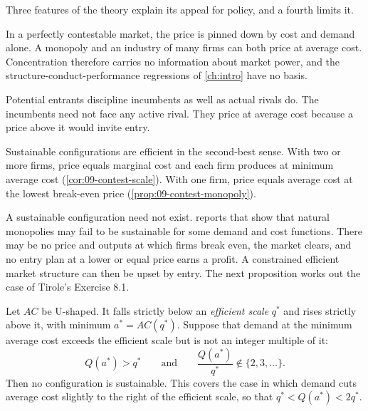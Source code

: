 Three features of the theory explain its appeal for policy, and a fourth limits it.

\begin{remark}\label{rem:09-structure}
In a perfectly contestable market, the price is pinned down by cost and demand alone. A monopoly and an
industry of many firms can both price at average cost. Concentration therefore carries no information about
market power, and the structure-conduct-performance regressions of \cref{ch:intro} have no basis.
\end{remark}

\begin{remark}\label{rem:09-potential}
Potential entrants discipline incumbents as well as actual rivals do. The incumbents need not face any active
rival. They price at average cost because a price above it would invite entry.
\end{remark}

\begin{remark}[Efficiency]\label{rem:09-efficiency}
Sustainable configurations are efficient in the second-best sense. With two or more firms, price equals
marginal cost and each firm produces at minimum average cost (\cref{cor:09-contest-scale}). With one firm,
price equals average cost at the lowest break-even price (\cref{prop:09-contest-monopoly}).
\end{remark}

\begin{remark}[Existence]\label{rem:09-existence}
A sustainable configuration need not exist. \citet[sec.~8.1.2]{Tirole1988} reports that
\citet{BaumolPanzarWillig1982} show that natural monopolies may fail to be sustainable for some demand and
cost functions. There may be no price and outputs at which firms break even, the market clears, and no entry
plan at a lower or equal price earns a profit. A constrained efficient market structure can then be upset by
entry. The next proposition works out the case of Tirole's Exercise 8.1.
\end{remark}

\begin{proposition}\label{prop:09-nonexist}
Let $AC$ be U-shaped. It falls strictly below an \emph{efficient scale} $q^*$ and rises strictly above it, with minimum $a^* = AC(q^*)$. Suppose that demand at the minimum
average cost exceeds the efficient scale but is not an integer multiple of it:
\begin{equation*}
  Q(a^*) > q^* \qquad\text{and}\qquad \frac{Q(a^*)}{q^*} \notin \{2, 3, \dots\}.
\end{equation*}
Then no configuration is sustainable. This covers the case in which demand cuts average cost slightly to
the right of the efficient scale, so that $q^* < Q(a^*) < 2q^*$.
\end{proposition}

